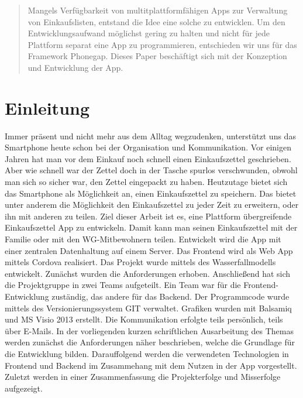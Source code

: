 \documentclass[10pt, conference, compsocconf]{IEEEtran}
\begin{document}
\begin{abstract}
Mangels Verfügbarkeit von multitplattformfähigen Apps zur Verwaltung von Einkaufslisten, entstand die Idee eine solche zu entwicklen. Um den Entwicklungsaufwand möglichst gering zu halten und nicht für jede Plattform separat eine App zu programmieren, entschieden wir uns für das Framework Phonegap. Dieses Paper beschäftigt sich mit der Konzeption und Entwicklung der App.   
\end{abstract}

%


%
\IEEEpeerreviewmaketitle



\section{Einleitung}
Immer pr\"asent und nicht mehr aus dem Alltag wegzudenken, unterst\"utzt  uns das Smartphone heute schon bei der Organisation und Kommunikation. Vor einigen Jahren hat man vor dem Einkauf noch schnell einen Einkaufszettel geschrieben. Aber wie schnell war der Zettel doch in der Tasche spurlos verschwunden, obwohl man sich so sicher war, den Zettel eingepackt zu haben. Heutzutage bietet sich das Smartphone als M\"oglichkeit an, einen Einkaufszettel zu speichern. Das bietet unter anderem die M\"oglichkeit den Einkaufszettel zu jeder Zeit zu erweitern, oder ihn mit anderen zu teilen. 
Ziel dieser Arbeit ist es, eine Plattform \"ubergreifende Einkaufszettel App zu entwickeln. Damit kann man seinen Einkaufszettel mit der Familie oder mit den WG-Mitbewohnern teilen. Entwickelt wird die App mit einer zentralen Datenhaltung auf einem Server. Das Frontend wird als Web App mittels Cordova realisiert. Das Projekt wurde mittels des Wasserfallmodells entwickelt. Zun\"achst wurden die Anforderungen erhoben. Anschlie{\ss}end hat sich die Projektgruppe in zwei Teams aufgeteilt. Ein Team war f\"ur die Frontend-Entwicklung zust\"andig, das andere f\"ur das Backend. Der Programmcode wurde mittels des Versionierungssystem GIT verwaltet. Grafiken wurden mit Balsamiq und MS Visio 2013 erstellt. Die Kommunikation erfolgte teils pers\"onlich, teils \"uber E-Mails.
In der vorliegenden kurzen schriftlichen Ausarbeitung des Themas werden zun\"achst die Anforderungen n\"aher beschrieben, welche die Grundlage f\"ur die Entwicklung bilden. Darauffolgend werden die verwendeten Technologien in Frontend und Backend im Zusammehang mit dem Nutzen in der App vorgestellt. Zuletzt werden in einer Zusammenfassung die Projekterfolge und Misserfolge aufgezeigt.
\end{document}

